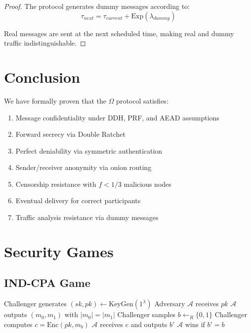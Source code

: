 \documentclass[11pt,a4paper]{article}
\begin{document}
\begin{proof}
The protocol generates dummy messages according to:
$$\tau_{next} = \tau_{current} + \text{Exp}(\lambda_{dummy})$$

Real messages are sent at the next scheduled time, making real and dummy traffic indistinguishable.
\end{proof}

\section{Conclusion}

We have formally proven that the $\Omega$ protocol satisfies:

\begin{enumerate}
    \item Message confidentiality under DDH, PRF, and AEAD assumptions
    \item Forward secrecy via Double Ratchet
    \item Perfect deniability via symmetric authentication
    \item Sender/receiver anonymity via onion routing
    \item Censorship resistance with $f < 1/3$ malicious nodes
    \item Eventual delivery for correct participants
    \item Traffic analysis resistance via dummy messages
\end{enumerate}

\appendix

\section{Security Games}

\subsection{IND-CPA Game}

\begin{algorithm}
\caption{IND-CPA Security Game}
\begin{algorithmic}[1]
\State Challenger generates $(sk, pk) \leftarrow \text{KeyGen}(1^\lambda)$
\State Adversary $\mathcal{A}$ receives $pk$
\State $\mathcal{A}$ outputs $(m_0, m_1)$ with $|m_0| = |m_1|$
\State Challenger samples $b \leftarrow_R \{0, 1\}$
\State Challenger computes $c = \text{Enc}(pk, m_b)$
\State $\mathcal{A}$ receives $c$ and outputs $b'$
\State $\mathcal{A}$ wins if $b' = b$
\end{algorithmic}
\end{algorithm}
\end{document}

